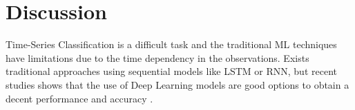 %
%
\section{Discussion}
Time-Series Classification is a difficult task and the traditional ML techniques have limitations due to the time dependency in the observations. Exists traditional approaches using sequential models like LSTM or RNN, but recent studies shows that the use of Deep Learning models are good options to obtain a decent performance and accuracy \cite{Fawaz2019}. 
